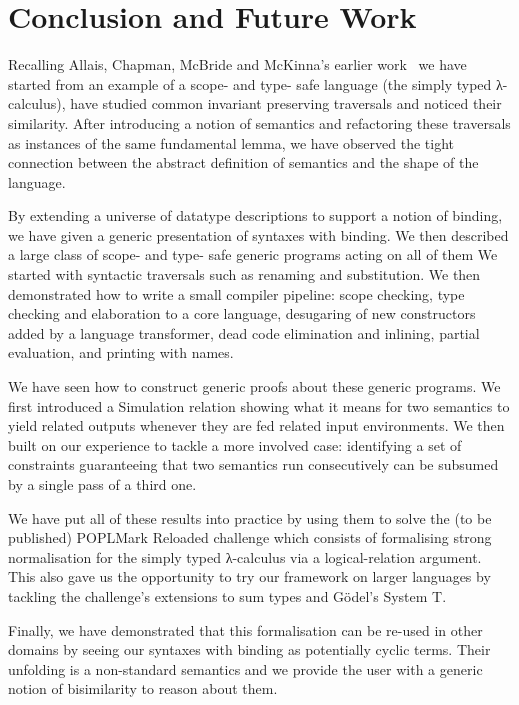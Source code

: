 {\section{Conclusion and Future Work}

Recalling Allais, Chapman, McBride and McKinna's earlier work~\citeyear{allais2017type}
we have started from an example of a scope- and type- safe language (the simply typed
λ-calculus), have studied common invariant preserving traversals and noticed their
similarity. After introducing a notion of semantics and refactoring these traversals as
instances of the same fundamental lemma, we have observed the tight
connection between the abstract definition of semantics and the shape of the
language.

By extending a universe of datatype descriptions to support a notion of binding,
we have given a generic presentation of syntaxes with binding. We then described
a large class of scope- and type- safe generic programs acting on all of them
We started with syntactic traversals such as renaming and substitution. We then
demonstrated how to write a small compiler pipeline: scope checking, type checking
and elaboration to a core language, desugaring of new constructors added by a language
transformer, dead code elimination and inlining, partial evaluation, and printing
with names.

We have seen how to construct generic proofs about these generic programs. We
first introduced a Simulation relation showing what it means for two semantics
to yield related outputs whenever they are fed related input environments. We
then built on our experience to tackle a more involved case: identifying a set
of constraints guaranteeing that two semantics run consecutively can be subsumed
by a single pass of a third one.

We have put all of these results into practice by using them to solve the (to be
published) POPLMark Reloaded challenge which consists of formalising strong
normalisation for the simply typed λ-calculus via a logical-relation
argument. This also gave us the opportunity to try our framework on larger
languages by tackling the challenge's extensions to sum types and G\"{o}del's
System T.

Finally, we have demonstrated that this formalisation can be re-used
in other domains by seeing our syntaxes with binding as potentially cyclic
terms. Their unfolding is a non-standard semantics and we provide the
user with a generic notion of bisimilarity to reason about them.

}
